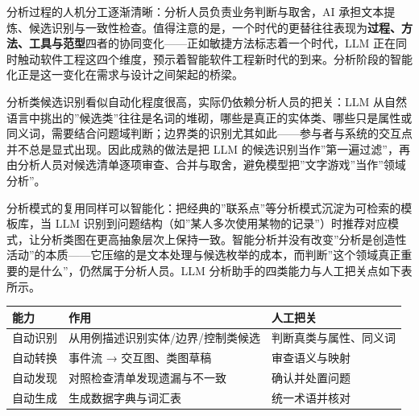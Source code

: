 \documentclass[
]{ctexbook}
\newcounter{none}
\begin{document}
分析过程的人机分工逐渐清晰：分析人员负责业务判断与取舍，AI
承担文本提炼、候选识别与一致性检查。值得注意的是，一个时代的更替往往表现为\textbf{过程、方法、工具与范型}四者的协同变化------正如敏捷方法标志着一个时代，LLM
正在同时触动软件工程这四个维度，预示着智能软件工程新时代的到来。分析阶段的智能化正是这一变化在需求与设计之间架起的桥梁。

分析类候选识别看似自动化程度很高，实际仍依赖分析人员的把关：LLM
从自然语言中挑出的''候选类''往往是名词的堆砌，哪些是真正的实体类、哪些只是属性或同义词，需要结合问题域判断；边界类的识别尤其如此------参与者与系统的交互点并不总是显式出现。因此成熟的做法是把
LLM
的候选识别当作''第一遍过滤''，再由分析人员对候选清单逐项审查、合并与取舍，避免模型把''文字游戏''当作''领域分析''。

分析模式的复用同样可以智能化：把经典的''联系点''等分析模式沉淀为可检索的模板库，当
LLM
识别到问题结构（如''某人多次使用某物的记录''）时推荐对应模式，让分析类图在更高抽象层次上保持一致。智能分析并没有改变''分析是创造性活动''的本质------它压缩的是文本处理与候选枚举的成本，而判断''这个领域真正重要的是什么''，仍然属于分析人员。LLM
分析助手的四类能力与人工把关点如下表所示。

{\def\LTcaptype{none} %
\begin{longtable}[]{@{}
  >{\raggedright\arraybackslash}p{}
  >{\raggedright\arraybackslash}p{}
  >{\raggedright\arraybackslash}p{}@{}}
\toprule\noalign{}
\begin{minipage}[b]{\linewidth}\raggedright
能力
\end{minipage} & \begin{minipage}[b]{\linewidth}\raggedright
作用
\end{minipage} & \begin{minipage}[b]{\linewidth}\raggedright
人工把关
\end{minipage} \\
\midrule\noalign{}
\endhead
\bottomrule\noalign{}
\endlastfoot
自动识别 & 从用例描述识别实体/边界/控制类候选 &
判断真类与属性、同义词 \\
自动转换 & 事件流 → 交互图、类图草稿 & 审查语义与映射 \\
自动发现 & 对照检查清单发现遗漏与不一致 & 确认并处置问题 \\
自动生成 & 生成数据字典与词汇表 & 统一术语并核对 \\
\end{longtable}
}
\end{document}
